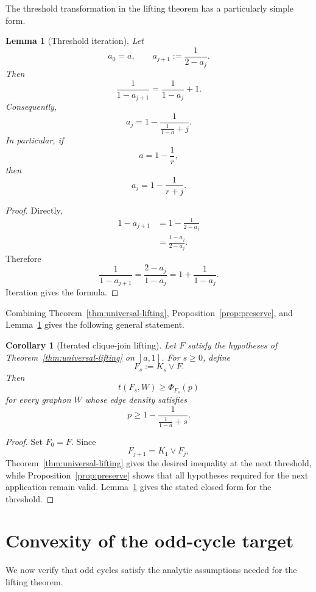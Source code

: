 \documentclass[11pt]{article}
\newtheorem{lemma}[theorem]{Lemma}
\newtheorem{corollary}[theorem]{Corollary}
\newcommand{\1}{\mathbf{1}}
\newcommand{\join}{\vee}
\begin{document}
The threshold transformation in the lifting theorem has a particularly
simple form.

\begin{lemma}[Threshold iteration]
\label{lem:threshold}
Let
\[
a_0=a,
\qquad
a_{j+1}:=\frac1{2-a_j}.
\]
Then
\[
\frac1{1-a_{j+1}}
=
\frac1{1-a_j}+1.
\]
Consequently,
\[
a_j
=
1-
\frac1{\frac1{1-a}+j}.
\]
In particular, if
\[
a=1-\frac1r,
\]
then
\[
a_j=1-\frac1{r+j}.
\]
\end{lemma}

\begin{proof}
Directly,
\begin{align*}
1-a_{j+1}
&=
1-\frac1{2-a_j}
\\
&=
\frac{1-a_j}{2-a_j}.
\end{align*}
Therefore
\[
\frac1{1-a_{j+1}}
=
\frac{2-a_j}{1-a_j}
=
1+\frac1{1-a_j}.
\]
Iteration gives the formula.
\end{proof}

Combining
Theorem~\ref{thm:universal-lifting},
Proposition~\ref{prop:preserve},
and Lemma~\ref{lem:threshold}
gives the following general statement.

\begin{corollary}[Iterated clique-join lifting]
\label{cor:iterated-lift}
Let $F$ satisfy the hypotheses of
Theorem~\ref{thm:universal-lifting}
on $[a,1]$.
For $s\ge0$, define
\[
F_s:=K_s\join F.
\]
Then
\[
t(F_s,W)\ge\Phi_{F_s}(p)
\]
for every graphon $W$ whose edge density satisfies
\[
p\ge
1-
\frac1{\frac1{1-a}+s}.
\]
\end{corollary}

\begin{proof}
Set $F_0=F$.  Since
\[
F_{j+1}
=
K_1\join F_j,
\]
Theorem~\ref{thm:universal-lifting} gives the desired inequality at
the next threshold, while
Proposition~\ref{prop:preserve} shows that all hypotheses required
for the next application remain valid.
Lemma~\ref{lem:threshold} gives the stated closed form for the
threshold.
\end{proof}


\section{Convexity of the odd-cycle target}

We now verify that odd cycles satisfy the analytic assumptions needed
for the lifting theorem.
\end{document}
